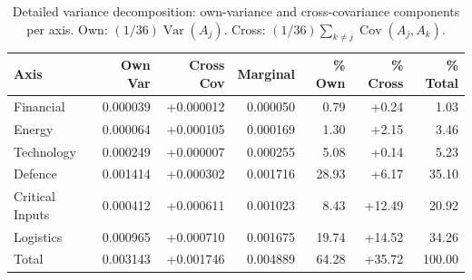 \begin{table}[htbp]
\centering
\caption{Detailed variance decomposition: own-variance and cross-covariance components per axis.  Own: $(1/36)\operatorname{Var}(A_j)$.  Cross: $(1/36)\sum_{k \neq j}\operatorname{Cov}(A_j, A_k)$.}
\label{tab:full-variance-detail}
\small
\begin{tabular}{@{}l rrr rrr@{}}
\toprule
\textbf{Axis} & \textbf{Own Var} & \textbf{Cross Cov} & \textbf{Marginal} & \textbf{\% Own} & \textbf{\% Cross} & \textbf{\% Total} \\
\midrule
  Financial & 0.000039 & +0.000012 & 0.000050 & 0.79 & +0.24 & 1.03 \\
  Energy & 0.000064 & +0.000105 & 0.000169 & 1.30 & +2.15 & 3.46 \\
  Technology & 0.000249 & +0.000007 & 0.000255 & 5.08 & +0.14 & 5.23 \\
  Defence & 0.001414 & +0.000302 & 0.001716 & 28.93 & +6.17 & 35.10 \\
  Critical Inputs & 0.000412 & +0.000611 & 0.001023 & 8.43 & +12.49 & 20.92 \\
  Logistics & 0.000965 & +0.000710 & 0.001675 & 19.74 & +14.52 & 34.26 \\
\midrule
  Total & 0.003143 & +0.001746 & 0.004889 & 64.28 & +35.72 & 100.00 \\
\bottomrule
\end{tabular}
\end{table}